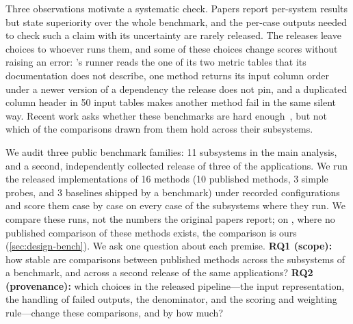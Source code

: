 Three observations motivate a systematic check.
Papers report per-system results but state superiority over the whole benchmark, and the per-case outputs needed to check such a claim with its uncertainty are rarely released.
The releases leave choices to whoever runs them, and some of these choices change scores without raising an error: \rcaeval's runner reads the one of its two metric tables that its documentation does not describe, one method returns its input column order under a newer version of a dependency the release does not pin, and a duplicated column header in 50 input tables makes another method fail in the same silent way.
Recent work asks whether these benchmarks are hard enough~\citep{fang2025simplerca}, but not which of the comparisons drawn from them hold across their subsystems.

We audit three public benchmark families: 11 subsystems in the main analysis, and a second, independently collected release of three of the applications.
We run the released implementations of 16 methods (10 published methods, 3 simple probes, and 3 baselines shipped by a benchmark) under recorded configurations and score them case by case on every case of the subsystems where they run.
We compare these runs, not the numbers the original papers report; on \openrca, where no published comparison of these methods exists, the comparison is ours (\cref{sec:design-bench}).
We ask one question about each premise.
\textbf{RQ1 (scope):} how stable are comparisons between published methods across the subsystems of a benchmark, and across a second release of the same applications?
\textbf{RQ2 (provenance):} which choices in the released pipeline---the input representation, the handling of failed outputs, the denominator, and the scoring and weighting rule---change these comparisons, and by how much?

